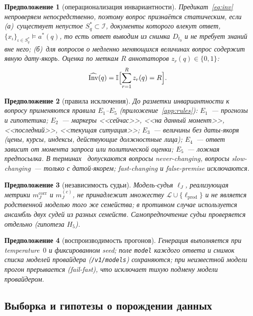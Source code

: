 \documentclass{article}
\newtheorem{assumption}{Предположение}
\newcommand{\I}{\mathbb{I}}                         %
\newcommand{\Inv}{\mathrm{Inv}}
\newcommand{\Lm}{\mathcal{L}}
\newcommand{\lprod}{\ell_{\mathrm{prod}}}
\newcommand{\lJ}{\ell_{J}}
\newcommand{\mcorr}{m_J^{\mathrm{corr}}}
\begin{document}
\begin{assumption}[операционализация инвариантности]\label{as:inv}
Предикат~\eqref{eq:inv} непроверяем непосредственно, поэтому вопрос признаётся статическим, если (а)~существует непустое $S^*_q\subset\mathcal{I}$, документы которого влекут ответ, $\{x_\iota\}_{\iota\in S^*_q}\models a^*(q)$, то есть ответ выводим из снимка $D_{t_0}$ и не требует знаний вне него; (б)~для вопросов о медленно меняющихся величинах вопрос содержит явную дату-якорь. Оценка по меткам $R$ аннотаторов $z_r(q)\in\{0,1\}$:
\begin{equation}\label{eq:invhat}
  \widehat{\Inv}(q)=\I\Bigl[\sum_{r=1}^R z_r(q)=R\Bigr].
\end{equation}
\end{assumption}

\begin{assumption}[правила исключения]\label{as:rules}
До разметки инвариантности к вопросу применяются правила $E_1$--$E_5$ (приложение~\ref{app:rules}): $E_1$~--- прогнозы и гипотетика; $E_2$~--- маркеры <<сейчас>>, <<на данный момент>>, <<последний>>, <<текущая ситуация>>; $E_3$~--- величины без даты-якоря (цены, курсы, индексы, действующие должностные лица); $E_4$~--- ответ зависит от момента запроса или политической оценки; $E_5$~--- ложная предпосылка. В терминах~\cite{vu2023freshllms} допускаются вопросы never-changing, вопросы slow-changing~--- только с датой-якорем; fast-changing и false-premise исключаются.
\end{assumption}

\begin{assumption}[независимость судьи]\label{as:judge}
Модель-судья $\lJ$, реализующая метрики $\mcorr$ и $m_J^{(c)}$, не принадлежит множеству $\Lm\cup\{\lprod\}$ и не является родственной моделью того же семейства; в противном случае используется ансамбль двух судей из разных семейств. Самопредпочтение судьи проверяется отдельно (гипотеза $H_5$).
\end{assumption}

\begin{assumption}[воспроизводимость прогонов]\label{as:repro}
Генерация выполняется при temperature~$0$ и фиксированном seed; поле \texttt{model} каждого ответа и снимок списка моделей провайдера (\texttt{/v1/models}) сохраняются; при неизвестной модели прогон прерывается (fail-fast), что исключает тихую подмену модели провайдером.
\end{assumption}

\subsection{Выборка и гипотезы о порождении данных}
\end{document}
